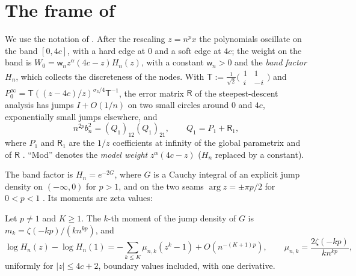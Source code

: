\section{The frame of \texorpdfstring{\cite{PaperII}}{[II]}}\label{sec:frame}

We use the notation of \cite[Sections~4, 8 and~10]{PaperII}. After the rescaling $z=n^px$ the polynomials oscillate on the band
$[0,4c]$, with a hard edge at $0$ and a soft edge at $4c$; the weight on the band is $W_0=\mathsf w_nz^\alpha(4c-z)H_n(z)$, with a constant
$\mathsf w_n>0$ and the \emph{band factor} $H_n$, which collects the discreteness of the nodes. With
$\mathsf T:=\frac1{\sqrt2}\bigl(\begin{smallmatrix}1&1\\i&-i\end{smallmatrix}\bigr)$ and
$P_0^\infty=\mathsf T((z-4c)/z)^{\sigma_3/4}\mathsf T^{-1}$, the error matrix $\mathsf R$ of the steepest-descent analysis has jumps
$I+O(1/n)$ on two small circles around $0$ and $4c$, exponentially small jumps elsewhere, and
\begin{equation}\label{eq:extract}
  n^{2p}b_n^2=(Q_1)_{12}(Q_1)_{21},\qquad Q_1=P_1+\mathsf R_1,
\end{equation}
where $P_1$ and $\mathsf R_1$ are the $1/z$ coefficients at infinity of the global parametrix and of $\mathsf R$
\cite[Lemmas~4.1, 4.2, Proposition~5.6]{PaperII}. ``Mod'' denotes the \emph{model weight} $z^\alpha(4c-z)$ ($H_n$ replaced by a constant).

The band factor is $H_n=e^{-2G}$, where $G$ is a Cauchy integral of an explicit jump density on $(-\infty,0)$ for $p>1$, and on the two
seams $\arg z=\pm\pi p/2$ for $0<p<1$ \cite[Lemmas~8.1 and~10.1]{PaperII}. Its moments are zeta values:

\begin{lemma}\label{lem:Fprime}
Let $p\ne1$ and $K\ge1$. The $k$-th moment of the jump density of $G$ is $m_k=\zeta(-kp)/(kn^{kp})$, and
\[
  \log H_n(z)-\log H_n(1)=-\sum_{k\le K}\mu_{n,k}(z^k-1)+O(n^{-(K+1)p}),\qquad\mu_{n,k}=\frac{2\zeta(-kp)}{kn^{kp}},
\]
uniformly for $|z|\le4c+2$, boundary values included, with one derivative.
\end{lemma}

